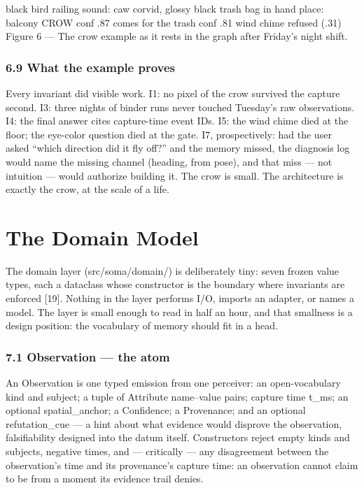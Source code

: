black bird \textperiodcentered{} railing sound: caw corvid, glossy black trash bag in hand place: balcony CROW conf .87 comes for the trash conf .81 wind chime refused (.31) Figure 6 --- The crow example as it rests in the graph after Friday's night shift.

\subsection{6.9 What the example proves}\label{what-the-example-proves}

Every invariant did visible work. I1: no pixel of the crow survived the capture second. I3: three nights of binder runs never touched Tuesday's raw observations. I4: the final answer cites capture-time event IDs. I5: the wind chime died at the floor; the eye-color question died at the gate. I7, prospectively: had the user asked ``which direction did it fly off?'' and the memory missed, the diagnosis log would name the missing channel (heading, from pose), and that miss --- not intuition --- would authorize building it. The crow is small. The architecture is exactly the crow, at the scale of a life.

\chapter{The Domain Model}\label{the-domain-model}

The domain layer (src/soma/domain/) is deliberately tiny: seven frozen value types, each a dataclass whose constructor is the boundary where invariants are enforced {[}19{]}. Nothing in the layer performs I/O, imports an adapter, or names a model. The layer is small enough to read in half an hour, and that smallness is a design position: the vocabulary of memory should fit in a head.

\subsection{7.1 Observation --- the atom}\label{observation-the-atom}

An Observation is one typed emission from one perceiver: an open-vocabulary kind and subject; a tuple of Attribute name--value pairs; capture time t\_ms; an optional spatial\_anchor; a Confidence; a Provenance; and an optional refutation\_cue --- a hint about what evidence would disprove the observation, falsifiability designed into the datum itself. Constructors reject empty kinds and subjects, negative times, and --- critically --- any disagreement between the observation's time and its provenance's capture time: an observation cannot claim to be from a moment its evidence trail denies.

